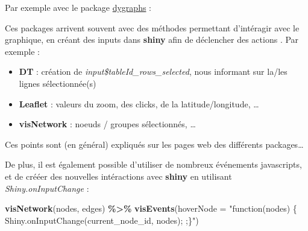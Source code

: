 \documentclass[
]{article}
\newenvironment{Shaded}{\begin{snugshade}}{\end{snugshade}}
\newcommand{\AttributeTok}[1]{\textcolor[rgb]{0.13,0.29,0.53}{#1}}
\newcommand{\CommentTok}[1]{\textcolor[rgb]{0.56,0.35,0.01}{\textit{#1}}}
\newcommand{\FunctionTok}[1]{\textcolor[rgb]{0.13,0.29,0.53}{\textbf{#1}}}
\newcommand{\NormalTok}[1]{#1}
\newcommand{\OtherTok}[1]{\textcolor[rgb]{0.56,0.35,0.01}{#1}}
\newcommand{\SpecialCharTok}[1]{\textcolor[rgb]{0.81,0.36,0.00}{\textbf{#1}}}
\newcommand{\StringTok}[1]{\textcolor[rgb]{0.31,0.60,0.02}{#1}}
\providecommand{\tightlist}{%
  \setlength{\itemsep}{0pt}\setlength{\parskip}{0pt}}
\begin{document}
Par exemple avec le package
\href{http://rstudio.github.io/dygraphs/}{dygraphs} :

\begin{Shaded}
\end{Shaded}

Ces packages arrivent souvent avec des méthodes permettant d'intéragir
avec le graphique, en créant des inputs dans \textbf{shiny} afin de
déclencher des actions . Par exemple :

\begin{itemize}
\tightlist
\item
  \textbf{DT} : création de \emph{input\$tableId\_rows\_selected}, nous
  informant sur la/les lignes sélectionnée(s)
\item
  \textbf{Leaflet} : valeurs du zoom, des clicks, de la
  latitude/longitude, \ldots{}
\item
  \textbf{visNetwork} : noeuds / groupes sélectionnés, \ldots{}
\end{itemize}

Ces points sont (en général) expliqués sur les pages web des différents
packages\ldots{}

De plus, il est également possible d'utiliser de nombreux événements
javascripts, et de crééer des nouvelles intéractions avec \textbf{shiny}
en utilisant \emph{Shiny.onInputChange} :

\begin{Shaded}
\begin{Highlighting}[]
\FunctionTok{visNetwork}\NormalTok{(nodes, edges) }\SpecialCharTok{\%\textgreater{}\%}
      \FunctionTok{visEvents}\NormalTok{(}\AttributeTok{hoverNode =} \StringTok{"function(nodes) \{}
\StringTok{        Shiny.onInputChange(\textquotesingle{}current\_node\_id\textquotesingle{}, nodes);}
\StringTok{      ;\}"}\NormalTok{)}
\end{Highlighting}
\end{Shaded}
\end{document}
